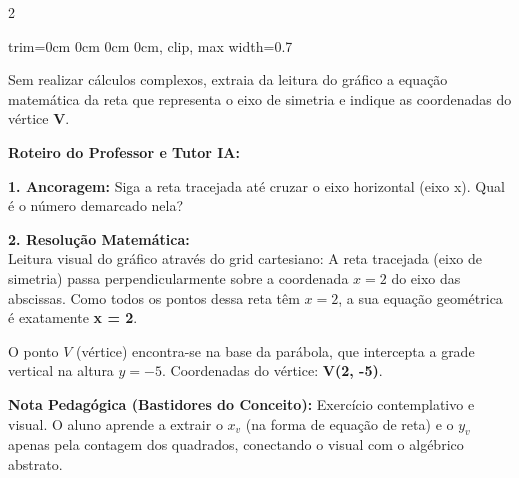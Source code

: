\begin{multicols*}{2}
\begin{enunciadoLiteral}
\begin{center}
\begin{adjustbox}{trim=0cm 0cm 0cm 0cm, clip, max width=0.7\linewidth}
\end{adjustbox}
\end{center}

Sem realizar cálculos complexos, extraia da leitura do gráfico a equação matemática da reta que representa o eixo de simetria e indique as coordenadas do vértice \textbf{V}.
\end{enunciadoLiteral}

\ifgabarito
    \begin{tcolorbox}[colback=CorTitUm!5, colframe=CorTitUm, boxrule=1pt, arc=4pt, left=6pt, right=6pt, top=6pt, bottom=6pt]
    \small\textbf{\textcolor{CorTitUm}{Roteiro do Professor e Tutor IA:}}\par\vspace{0.1cm}
    \color{CinzaEscuro}
    \textbf{1. Ancoragem:} Siga a reta tracejada até cruzar o eixo horizontal (eixo x). Qual é o número demarcado nela?\par\vspace{0.1cm}
    \textbf{2. Resolução Matemática:}\\
    Leitura visual do gráfico através do grid cartesiano:
    A reta tracejada (eixo de simetria) passa perpendicularmente sobre a coordenada $x = 2$ do eixo das abscissas. Como todos os pontos dessa reta têm $x=2$, a sua equação geométrica é exatamente \textbf{x = 2}.
    
    O ponto $V$ (vértice) encontra-se na base da parábola, que intercepta a grade vertical na altura $y = -5$.
    Coordenadas do vértice: \textbf{V(2, -5)}.
    \end{tcolorbox}
    \vspace{0.15cm}
    
    \begin{boxexplicacao}
    \textbf{Nota Pedagógica (Bastidores do Conceito):} Exercício contemplativo e visual. O aluno aprende a extrair o $x_v$ (na forma de equação de reta) e o $y_v$ apenas pela contagem dos quadrados, conectando o visual com o algébrico abstrato.
    \end{boxexplicacao}
\fi

\par\vspace{\espacoQuestao}


\end{multicols*}
